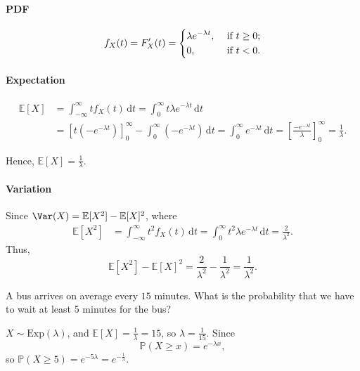 \paragraph{PDF}
\[
    f_X(t) = F_X^{\prime} (t) = \begin{dcases}
        \lambda e^{-\lambda t}, &\text{ if } t \ge 0 ;\\
        0, &\text{ if } t < 0.
    \end{dcases}
\]

\paragraph{Expectation}
\begin{align*}
    \mathbb{E} [X] &= \int _{-\infty }^{\infty } t f_X(t) \, \mathrm{d} t = \int _0^{\infty} t \lambda e^{-\lambda t} \, \mathrm{d} t \\
    &= [t(-e^{-\lambda t})]_0^{\infty} - \int _0^{\infty} (-e^{-\lambda t})\, \mathrm{d} t = \int _0^{\infty } e^{-\lambda t} \, \mathrm{d} t = \left[ \frac{-e^{-\lambda t}}{\lambda } \right]_0^{\infty} = \frac{1}{\lambda}.     
\end{align*}

Hence, \(\mathbb{E} [X] = \frac{1}{\lambda}\). 

\paragraph{Variation}
Since \(\Var(X) = \mathbb{E} [X^2] - \mathbb{E} [X]^2\), where 
\begin{align*}
    \mathbb{E} [X^2] &= \int _{-\infty }^{\infty} t^2 f_X(t) \, \mathrm{d} t = \int _0^{\infty } t^2 \lambda e^{-\lambda t} \, \mathrm{d} t = \frac{2}{\lambda ^2}.  
\end{align*} 
Thus,
\[
    \mathbb{E} [X^2] - \mathbb{E} [X]^2 = \frac{2}{\lambda ^2} - \frac{1}{\lambda^2} = \frac{1}{\lambda ^2}.
\]


\begin{eg}
    A bus arrives on average every \(15\) minutes. What is the probability that we have to wait at least 5 minutes for the bus? 
\end{eg}
\begin{explanation}
    \(X \sim \mathrm{Exp}(\lambda) \), and \(\mathbb{E} [X] = \frac{1}{\lambda} = 15\), so \(\lambda = \frac{1}{15}\). Since 
    \[
        \mathbb{P} (X \ge x) = e^{-\lambda x},
    \]   
    so \(\mathbb{P} (X \ge 5) = e^{-5 \lambda } = e^{-\frac{1}{3}}\). 
\end{explanation}

